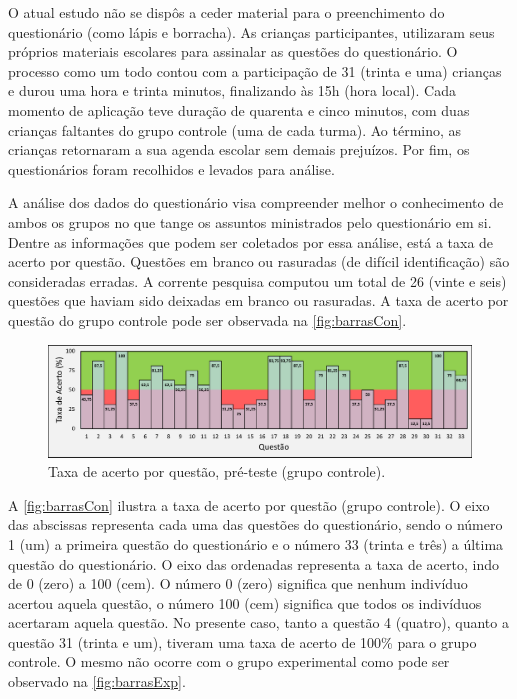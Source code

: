 O atual estudo não se dispôs a ceder material para o preenchimento do questionário (como lápis e borracha). As crianças participantes, utilizaram seus próprios materiais escolares para assinalar as questões do questionário. O processo como um todo contou com a participação de 31 (trinta e uma) crianças e durou uma hora e trinta minutos, finalizando às 15h (hora local). Cada momento de aplicação teve duração de quarenta e cinco minutos, com duas crianças faltantes do grupo controle (uma de cada turma). Ao término, as crianças retornaram a sua agenda escolar sem demais prejuízos. Por fim, os questionários foram recolhidos e levados para análise.

A análise dos dados do questionário visa compreender melhor o conhecimento de ambos os grupos no que tange os assuntos ministrados pelo questionário em si. Dentre as informações que podem ser coletados por essa análise, está a taxa de acerto por questão. Questões em branco ou rasuradas (de difícil identificação) são consideradas erradas. A corrente pesquisa computou um total de 26 (vinte e seis) questões que haviam sido deixadas em branco ou rasuradas. A taxa de acerto por questão do grupo controle pode ser observada na \autoref{fig:barrasCon}.

\begin{figure}[htb]

    \caption{\label{fig:barrasCon}Taxa de acerto por questão, pré-teste (grupo controle).}
    \includegraphics[width=\linewidth]{./Visuais/Notas4.pdf}
  
\end{figure}

A \autoref{fig:barrasCon} ilustra a taxa de acerto por questão (grupo controle). O eixo das abscissas representa cada uma das questões do questionário, sendo o número 1 (um) a primeira questão do questionário e o número 33 (trinta e três) a última questão do questionário. O eixo das ordenadas representa a taxa de acerto, indo de 0 (zero) a 100 (cem). O número 0 (zero) significa que nenhum indivíduo acertou aquela questão, o número 100 (cem) significa que todos os indivíduos acertaram aquela questão. No presente caso, tanto a questão 4 (quatro), quanto a questão 31 (trinta e um), tiveram uma taxa de acerto de 100\% para o grupo controle. O mesmo não ocorre com o grupo experimental como pode ser observado na \autoref{fig:barrasExp}.

